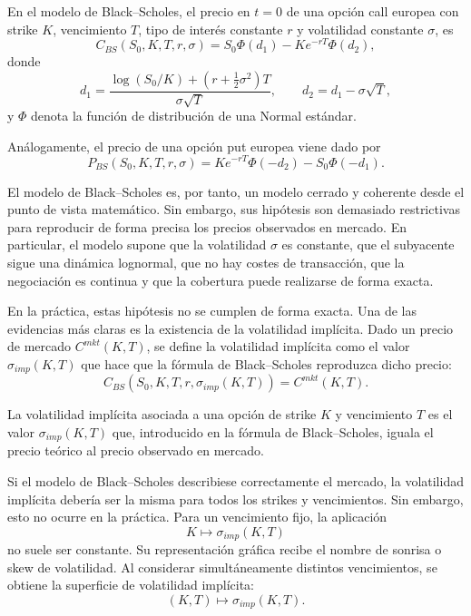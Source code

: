 \begin{proposition}
\label{prop:formula-black-scholes}
En el modelo de Black--Scholes, el precio en \(t=0\) de una opción call europea con strike \(K\), vencimiento \(T\), tipo de interés constante \(r\) y volatilidad constante \(\sigma\), es
\[
C_{BS}(S_0,K,T,r,\sigma)
=
S_0\Phi(d_1)
-
Ke^{-rT}\Phi(d_2),
\]
donde
\[
d_1=
\frac{
\log(S_0/K)+\left(r+\frac{1}{2}\sigma^2\right)T
}{
\sigma\sqrt{T}
},
\qquad
d_2=d_1-\sigma\sqrt{T},
\]
y \(\Phi\) denota la función de distribución de una Normal estándar.
\end{proposition}

Análogamente, el precio de una opción put europea viene dado por
\[
P_{BS}(S_0,K,T,r,\sigma)
=
Ke^{-rT}\Phi(-d_2)
-
S_0\Phi(-d_1).
\]

El modelo de Black--Scholes es, por tanto, un modelo cerrado y coherente desde el punto de vista matemático. Sin embargo, sus hipótesis son demasiado restrictivas para reproducir de forma precisa los precios observados en mercado. En particular, el modelo supone que la volatilidad \(\sigma\) es constante, que el subyacente sigue una dinámica lognormal, que no hay costes de transacción, que la negociación es continua y que la cobertura puede realizarse de forma exacta.

En la práctica, estas hipótesis no se cumplen de forma exacta. Una de las evidencias más claras es la existencia de la volatilidad implícita. Dado un precio de mercado \(C^{mkt}(K,T)\), se define la volatilidad implícita como el valor \(\sigma_{imp}(K,T)\) que hace que la fórmula de Black--Scholes reproduzca dicho precio:
\[
C_{BS}(S_0,K,T,r,\sigma_{imp}(K,T))
=
C^{mkt}(K,T).
\]

\begin{definition}
\label{def:volatilidad-implicita}
La volatilidad implícita asociada a una opción de strike \(K\) y vencimiento \(T\) es el valor \(\sigma_{imp}(K,T)\) que, introducido en la fórmula de Black--Scholes, iguala el precio teórico al precio observado en mercado.
\end{definition}

Si el modelo de Black--Scholes describiese correctamente el mercado, la volatilidad implícita debería ser la misma para todos los strikes y vencimientos. Sin embargo, esto no ocurre en la práctica. Para un vencimiento fijo, la aplicación
\[
K\longmapsto \sigma_{imp}(K,T)
\]
no suele ser constante. Su representación gráfica recibe el nombre de sonrisa o skew de volatilidad. Al considerar simultáneamente distintos vencimientos, se obtiene la superficie de volatilidad implícita:
\[
(K,T)\longmapsto \sigma_{imp}(K,T).
\]

